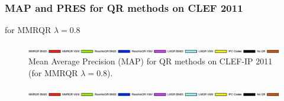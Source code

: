 \documentclass[xcolor=x11names,compress]{beamer}
\renewcommand{\(}{\begin{columns}}
\renewcommand{\)}{\end{columns}}
\newcommand{\<}[1]{\begin{column}{#1}}
\renewcommand{\>}{\end{column}}
\begin{document}
\begin{frame}
\frametitle{MAP and PRES for QR methods on CLEF 2011}

for MMRQR $\lambda=0.8$

\begin{figure}
\begin{centering}
\includegraphics[width=15.5cm]{../img/legendQR}
\par\end{centering}

\begin{centering}
\par\end{centering}

\caption{Mean Average Precision (MAP) for QR methods on CLEF-IP 2011 (for MMRQR
$\lambda=0.8$).}
\label{fig:QR-PRES-CLEF-IP2011}
\end{figure}


\begin{figure}
\begin{centering}
\includegraphics[width=15.5cm]{../img/legendQR}
\par\end{centering}


\end{figure}
\end{frame}
\end{document}
